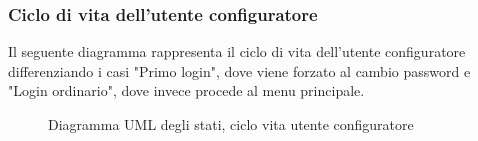\subsubsection{Ciclo di vita dell'utente configuratore}
Il seguente diagramma rappresenta il ciclo di vita dell'utente configuratore differenziando i casi "Primo login", dove 
viene forzato al cambio password e "Login ordinario", dove invece procede al menu principale.
\vspace{0.5cm}
\begin{figure}[H]
    \centering
    \caption{Diagramma UML degli stati, ciclo  vita utente configuratore}
    \label{fig:states_config_user_lifecycle}
\end{figure}